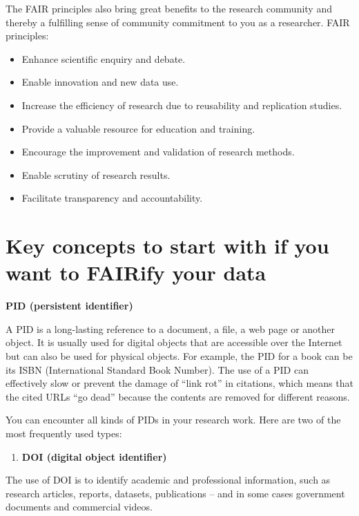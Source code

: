 \documentclass[
]{book}
\providecommand{\tightlist}{%
  \setlength{\itemsep}{0pt}\setlength{\parskip}{0pt}}
\begin{document}
The FAIR principles also bring great benefits to the research community and thereby a fulfilling sense of community commitment to you as a researcher. FAIR principles:

\begin{itemize}
\item
  Enhance scientific enquiry and debate.
\item
  Enable innovation and new data use.
\item
  Increase the efficiency of research due to reusability and replication studies.
\item
  Provide a valuable resource for education and training.
\item
  Encourage the improvement and validation of research methods.
\item
  Enable scrutiny of research results.
\item
  Facilitate transparency and accountability.
\end{itemize}

\hypertarget{key-concepts-to-start-with-if-you-want-to-fairify-your-data}{%
\section{Key concepts to start with if you want to FAIRify your data}\label{key-concepts-to-start-with-if-you-want-to-fairify-your-data}}

\textbf{PID (persistent identifier)}

A PID is a long-lasting reference to a document, a file, a web page or another object. It is usually used for digital objects that are accessible over the Internet but can also be used for physical objects. For example, the PID for a book can be its ISBN (International Standard Book Number). The use of a PID can effectively slow or prevent the damage of ``link rot'' in citations, which means that the cited URLs ``go dead'' because the contents are removed for different reasons.

You can encounter all kinds of PIDs in your research work. Here are two of the most frequently used types:

\begin{enumerate}
\def\labelenumi{\arabic{enumi}.}
\tightlist
\item
  \textbf{DOI (digital object identifier)}
\end{enumerate}

The use of DOI is to identify academic and professional information, such as research articles, reports, datasets, publications -- and in some cases government documents and commercial videos.
\end{document}

